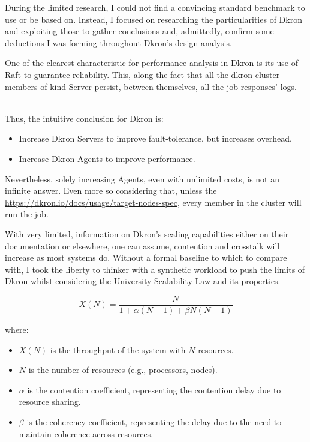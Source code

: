 \documentclass[runningheads]{llncs}
\begin{document}
During the limited research, I could not find a convincing standard benchmark to use or be based on.
Instead, I focused on researching the particularities of Dkron and exploiting those to gather conclusions and,
admittedly, confirm some deductions I was forming throughout Dkron's design analysis.

One of the clearest characteristic for performance analysis in Dkron is its use of Raft to guarantee
reliability. This, along the fact that all the dkron cluster members of kind Server persist,
between themselves, all the job responses' logs.

~\\ Thus, the intuitive conclusion for Dkron is:
\begin{itemize}
    \item Increase Dkron Servers to improve fault-tolerance, but increases overhead.
    \item Increase Dkron Agents to improve performance.
\end{itemize}


Nevertheless, solely increasing Agents, even with unlimited costs, is not an infinite answer.
Even more so considering that, unless the
\href{job is targeted to a set of tags}{https://dkron.io/docs/usage/target-nodes-spec},
every member in the cluster will run the job.

With very limited, information on Dkron's scaling capabilities either on their
documentation or elsewhere, one can assume, contention and crosstalk will increase as most systems do.
Without a formal baseline to which to compare with, I took the liberty to thinker with a synthetic workload
to push the limits of Dkron whilst considering the University Scalability Law and its properties.

\[
X(N) = \frac{N}{1 + \alpha (N - 1) + \beta N (N - 1)}
\]

where:
\begin{itemize}
    \item \( X(N) \) is the throughput of the system with \( N \) resources.
    \item \( N \) is the number of resources (e.g., processors, nodes).
    \item \( \alpha \) is the contention coefficient, representing the contention delay due to resource sharing.
    \item \( \beta \) is the coherency coefficient, representing the delay due to the need to maintain coherence across resources.
\end{itemize}
\end{document}
